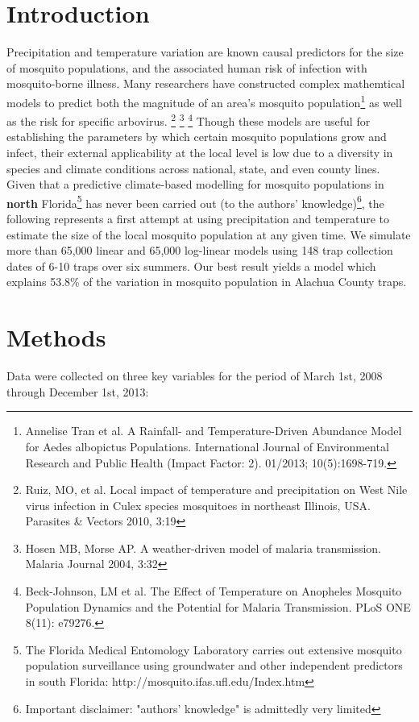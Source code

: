 \documentclass{article}
\begin{document}
\begin{multicols}{2}
\section*{Introduction}
Precipitation and temperature variation are known causal predictors for the size of mosquito populations, and the associated human risk of infection with mosquito-borne illness.  Many researchers have constructed complex mathemtical models to predict both the magnitude of an area's mosquito population\footnote{Annelise Tran et al. A Rainfall- and Temperature-Driven Abundance Model for Aedes albopictus Populations. International Journal of Environmental Research and Public Health (Impact Factor: 2). 01/2013; 10(5):1698-719.} as well as the risk for specific arbovirus.
\footnote{Ruiz, MO, et al. Local impact of temperature and precipitation on West Nile virus infection in Culex species mosquitoes in northeast Illinois, USA. Parasites & Vectors 2010, 3:19} 
\footnote{Hosen MB, Morse AP. A weather-driven model of malaria transmission. Malaria Journal 2004, 3:32}
\footnote{Beck-Johnson, LM et al. The Effect of Temperature on Anopheles Mosquito Population Dynamics and the Potential for Malaria Transmission. PLoS ONE 8(11): e79276.}
Though these models are useful for establishing the parameters by which certain mosquito populations grow and infect, their external applicability at the local level is low due to a diversity in species and climate conditions across national, state, and even county lines. \\

\noindent Given that a predictive climate-based modelling for mosquito populations in \textbf{north} Florida\footnote{The Florida Medical Entomology Laboratory carries out extensive mosquito population surveillance using groundwater and other independent predictors in south Florida: http://mosquito.ifas.ufl.edu/Index.htm} has never been carried out (to the authors' knowledge)\footnote{Important disclaimer: "authors' knowledge" is admittedly very limited}, the following represents a first attempt at using precipitation and temperature to estimate the size of the local mosquito population at any given time.  We simulate more than 65,000 linear and 65,000 log-linear models using 148 trap collection dates of 6-10 traps over six summers.  Our best result yields a model which explains 53.8\% of the variation in mosquito population in Alachua County traps.

\section*{Methods}
Data were collected on three key variables for the period of March 1st, 2008 through December 1st, 2013: \\


\end{multicols}
\end{document}

